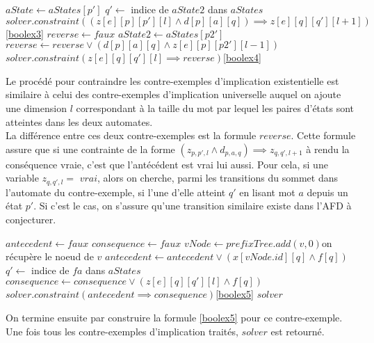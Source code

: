 \documentclass[12pt,a4paper,oneside,titlepage]{report}
\begin{document}
\begin{algorithm}[H]
\begin{algorithmic}[1]
			\State $aState\gets aStates[p']$
						\State $q'\gets$ indice de $aState2$ dans $aStates$
							\State $solver.constraint((z[e][p][p'][l]\land d[p][a][q])\implies z[e][q][q'][l+1])$\Comment\ref{boolex3}
						\EndFor
					\EndFor
				\EndFor
			\EndFor
					\State $reverse\gets faux$
						\State $aState2\gets aStates[p2']$
								\State $reverse\gets reverse \lor(d[p][a][q]\land z[e][p][p2'][l-1])$
							\EndFor
						\EndFor
					\EndFor
					\State $solver.constraint(z[e][q][q'][l]\implies reverse)$\Comment\ref{boolex4}
				\EndFor
			\EndFor
		\EndFor
{}
\end{algorithmic}
\end{algorithm}
\noindent Le procédé pour contraindre les contre-exemples d'implication existentielle est similaire à celui des contre-exemples d'implication universelle auquel on ajoute une dimension $l$ correspondant à la taille du mot par lequel les paires d'états sont atteintes dans les deux automates.\\
La différence entre ces deux contre-exemples est la formule $reverse$. Cette formule assure que si une contrainte de la forme $(z_{p,p',l}\land d_{p,a,q}) \implies z_{q,q',l+1}$ à rendu la conséquence vraie, c'est que l'antécédent est vrai lui aussi. Pour cela, si une variable $z_{q,q',l}=$ $vrai$, alors on cherche, parmi les transitions du sommet dans l'automate du contre-exemple, si l'une d'elle atteint $q'$ en lisant mot $a$ depuis un état $p'$. Si c'est le cas, on s'assure qu'une transition similaire existe dans l'AFD à conjecturer.
\begin{algorithm}[H]
\begin{algorithmic}[1]
		\State $antecedent\gets faux$
		\State $consequence\gets faux$
		\State $vNode\gets prefixTree.add(v,0)$\Comment on récupère le noeud de $v$
			\State $antecedent\gets antecedent\lor(x[vNode.id][q]\land f[q])$
				\State $q'\gets$ indice de $fa$ dans $aStates$
					\State $consequence\gets consequence\lor (z[e][q][q'][l]\land f[q])$
				\EndFor
			\EndFor
		\EndFor
		\State $solver.constraint(antecedent\implies consequence)$\Comment\ref{boolex5}
	\EndFor
\EndIf
\State\Return $solver$
\end{algorithmic}
\end{algorithm}
\noindent On termine ensuite par construire la formule \ref{boolex5} pour ce contre-exemple.\\
\noindent Une fois tous les contre-exemples d'implication traités, $solver$ est retourné.\\
\end{document}
